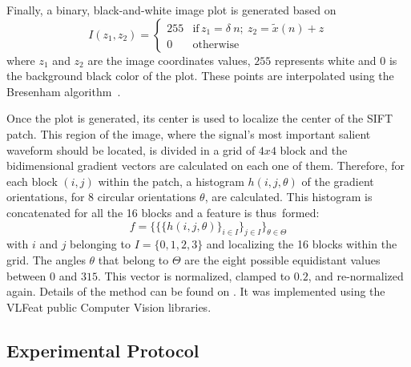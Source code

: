 \documentclass[brainsci,article,accept,moreauthors,pdftex,10pt,a4paper]{mdpi}
\begin{document}
Finally, a binary, black-and-white image plot is generated based on
\begin{equation}
I(z_1,z_2) = \left\{ \begin{array}{rl}
255 & \text{if} \,  z_1 = \delta \  n; \  z_2 = \tilde{x}(n) + z \\
0   & \mbox{otherwise}
\end{array}\right.
\label{eq:sift6}
\end{equation}
where $z_1$ and $z_2$ are the image coordinates values, $255$ represents white and $0$ is the background black color of the plot.  These points are interpolated using the Bresenham algorithm~\citep{Ramele2016}.

Once the plot is generated, its center is used to localize the center of the SIFT patch. This region of the image, where the signal's most important salient waveform should be located, is divided in a grid of $4 x 4$ block and the bidimensional gradient vectors are calculated on each one of them.  Therefore, for each block $(i,j)$ within the patch, a histogram $h(i,j,\theta)$ of the gradient orientations, for 8 circular orientations $\theta$, are calculated.  This histogram is concatenated for all the 16 blocks and a feature is thus~formed:
\begin{equation}
f = {\bigg \{ \bigg \{  \bigg \{ h(i,j,\theta) \bigg \}_{i \in I }  \bigg \}_{j \in I} \bigg \}_{\theta \in \Theta} }
\label{eq:sift7}
\end{equation}
with $i$ and $j$ belonging to $I = \{ 0,1,2,3 \} $ and localizing the 16 blocks within the grid. The angles $\theta$ that belong to $\Theta$ are the eight possible equidistant values between $0$ and $315$.  This vector is normalized, clamped to $0.2$, and re-normalized again.   Details of the method can be found on \citep{Ramele2016,Lowe2004}.  It was implemented using the VLFeat  \citep{Vedaldi2010} public Computer Vision libraries.



\subsection{Experimental Protocol}
\label{Experimental}

%
%
\end{document}
